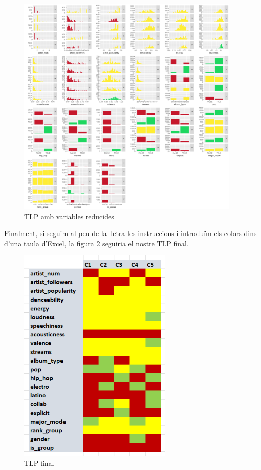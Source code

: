 \begin{figure}[H] 
    \centering
    \includegraphics[width=0.96\textwidth]{Images/5_TLP/TLP_reduced.png}
    \caption{TLP amb variables reducides}
    \label{fig:5_TLP:TLP_red}
\end{figure}

Finalment, si seguim al peu de la lletra les instruccions i introduïm els colors dins d'una taula d'Excel, la figura \ref{fig:5_TLP:TLP_final} seguiria el nostre TLP final.

\begin{figure}[H] 
    \centering
    \includegraphics[width=0.66\textwidth]{Images/5_TLP/TLP_final.png}
    \caption{TLP final}
    \label{fig:5_TLP:TLP_final}
\end{figure}